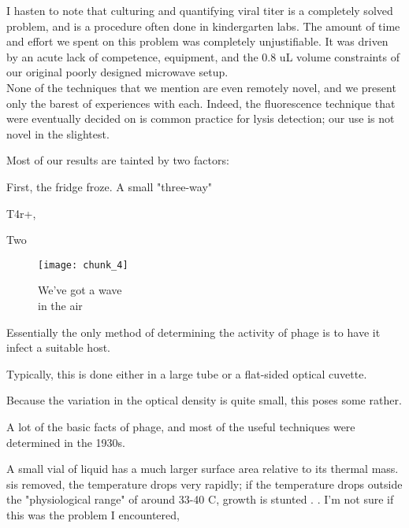 \documentclass[paper.tex]{subfiles}
\begin{document}
\begin{autem}
	I hasten to note that culturing and quantifying viral titer is a completely solved problem, and is a procedure often done in kindergarten labs. The amount of time and effort we spent on this problem was completely unjustifiable. It was driven by an acute lack of competence, equipment, and the 0.8 uL volume constraints of our original poorly designed microwave setup.\\
	
	None of the techniques that we mention are even remotely novel, and we present only the barest of experiences with each.
	Indeed, the fluorescence technique that were eventually decided on is common practice for lysis detection; our use is not novel in the slightest.
\end{autem}




Most of our results are tainted by two factors:

First, the fridge froze. A small "three-way" 

T4r+,

Two 





\begin{figure}[H]
	\captionsetup{singlelinecheck = false, justification=justified}
	\centering
	\texttt{[image: chunk\_4]}
	\caption{
		We've got a wave\\
		in the air}
\end{figure}

Essentially the only method of determining the activity of phage is to have it infect a suitable host.

Typically, this is done either in a large tube or a flat-sided optical cuvette.

Because the variation in the optical density is quite small, this poses some rather. 

A lot of the basic facts of phage, and most of the useful techniques were determined in the 1930s. 



A small vial of liquid has a much larger surface area relative to its thermal mass. sis removed, the temperature drops very rapidly; if the temperature drops outside the "physiological range" of around 33-40 C, growth is stunted \cite{effect2003}. \cite{growth1946}. I'm not sure if this was the problem I encountered, 
\end{document}
